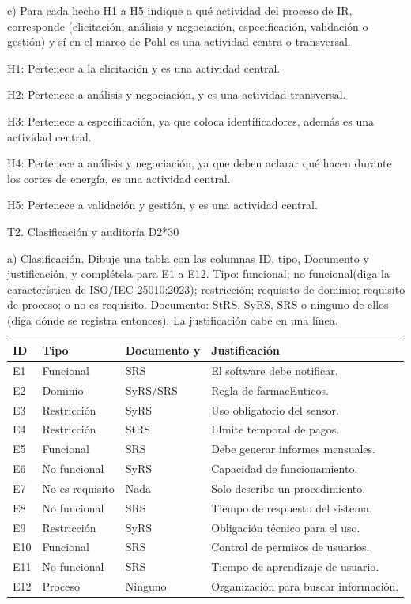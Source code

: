 \documentclass[11pt,a4paper]{article}
\begin{document}
c) Para cada hecho H1 a H5 indique a qué actividad del proceso de IR, corresponde (elicitación, análisis y negociación, especificación, validación o gestión) y sí en el marco de Pohl es una actividad centra o transversal.

H1: Pertenece a la elicitación y es una actividad central.

H2: Pertenece a análisis y negociación, y es una actividad transversal.

H3: Pertenece a especificación, ya que coloca identificadores, además es una actividad central.

H4: Pertenece a análisis y negociación, ya que deben aclarar qué hacen durante los cortes de energía, es una actividad central.

H5: Pertenece a validación y gestión, y es una actividad central.

\clearpage

T2. Clasificación y auditoría \hfill D2*30

a) Clasificación. Dibuje una tabla con las columnas ID, tipo, Documento y justificación, y complétela para E1 a E12. Tipo: funcional; no funcional(diga la característica de ISO/IEC 25010:2023); restricción; requisito de dominio; requisito de proceso; o no es requisito. Documento: StRS, SyRS, SRS o ninguno de ellos (diga dónde se registra entonces). La justificación cabe en una línea.

\medskip
\begin{longtable}{|p{1.2cm}|p{2.8cm}|p{2.6cm}|p{8.4cm}|}
\hline
ID & Tipo & Documento y & Justificación \\ \hline
E1 & Funcional & SRS & El software debe notificar. \\ \hline
E2 & Dominio & SyRS/SRS & Regla de farmacEuticos. \\ \hline
E3 & Restricción & SyRS & Uso obligatorio del sensor. \\ \hline
E4 & Restricción & StRS & LImite temporal de pagos. \\ \hline
E5 & Funcional & SRS & Debe generar informes mensuales. \\ \hline
E6 & No funcional & SyRS & Capacidad de funcionamiento. \\ \hline
E7 & No es requisito & Nada & Solo describe un procedimiento. \\ \hline
E8 & No funcional & SRS & Tiempo de respuesto del sistema. \\ \hline
E9 & Restricción & SyRS & Obligación técnico para el uso. \\ \hline
E10 & Funcional & SRS & Control de permisos de usuarios. \\ \hline
E11 & No funcional & SRS & Tiempo de aprendizaje de usuario. \\ \hline
E12 & Proceso & Ninguno & Organización para buscar información. \\ \hline
\end{longtable}
\end{document}

